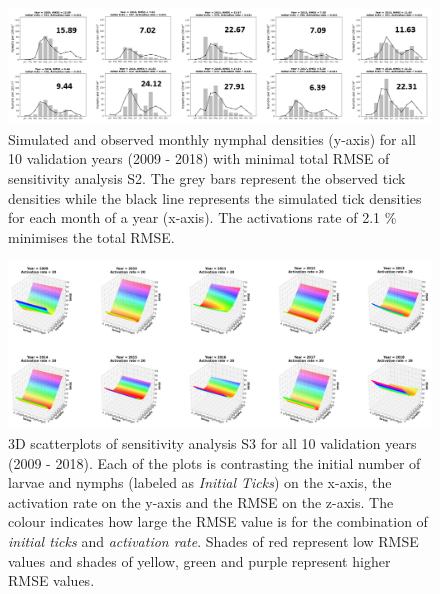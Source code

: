 \documentclass[a4paper, 11pt]{scrartcl}
\begin{document}
\begin{figure}
\centering
\includegraphics[width=1.0\textwidth]{figures/initial_ticks_without_beech}
\caption{Simulated and observed monthly nymphal densities (y-axis) for all 10 validation years (2009 - 2018) with minimal total RMSE of sensitivity analysis S2. The grey bars
represent the observed tick densities while the black line represents the simulated tick densities for each month of a year (x-axis). The activations rate of 2.1 \% minimises
the total RMSE.}
\label{fig:initial_ticks_without_beech_rotated}
\end{figure}

\begin{figure}
\centering
\includegraphics[width=1.0\textwidth]{figures/independent_initial_ticks_with_beech_error}
\caption{3D scatterplots of sensitivity analysis S3 for all 10 validation years (2009 - 2018). Each of the plots is contrasting the initial number of larvae and nymphs
(labeled as \textit{Initial Ticks}) on the x-axis, the activation rate on the y-axis and the RMSE on the z-axis. The colour indicates how large the RMSE value is for the
combination of \textit{initial ticks} and \textit{activation rate}. Shades of red represent low RMSE values and shades of yellow, green and purple represent higher RMSE values.}
\label{fig:independent_initial_ticks_with_beech_error_rotated}
\end{figure}
\end{document}
